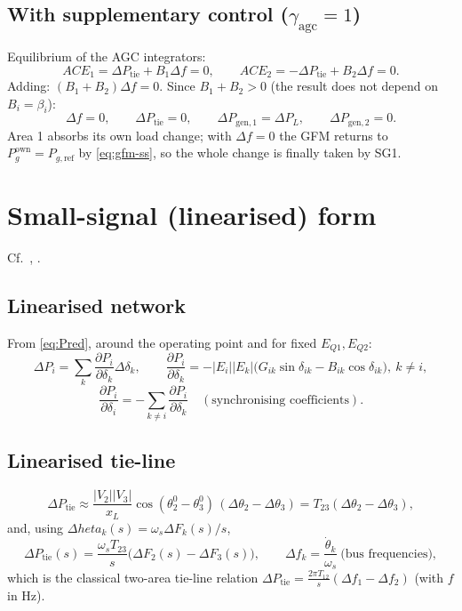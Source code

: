 \documentclass[11pt,a4paper]{article}
\numberwithin{equation}{section}
\begin{document}
\subsection{With supplementary control ($\gamma_{\text{agc}}=1$)}
Equilibrium of the AGC integrators:
\begin{equation}
ACE_1 = \Delta P_{\text{tie}} + B_1\Delta f = 0,\qquad ACE_2 = -\Delta P_{\text{tie}} + B_2\Delta f = 0 .
\end{equation}
Adding: $(B_1+B_2)\Delta f = 0$. Since $B_1+B_2>0$ (the result does not depend on $B_i=\beta_i$):
\begin{equation}
\boxed{\Delta f = 0,\qquad \Delta P_{\text{tie}} = 0,\qquad \Delta P_{\text{gen},1} = \Delta P_L,\qquad \Delta P_{\text{gen},2} = 0 .}
\end{equation}
Area 1 absorbs its own load change; with $\Delta f=0$ the GFM returns to $P_g^{\text{own}} = P_{g,\text{ref}}$ by \eqref{eq:gfm-ss}, so the whole change is finally taken by SG1.

\section{Small-signal (linearised) form}
%
\noindent Cf.\ \cite[Ch.~12]{Kundur1994}, \cite{SauerPai1998}.
\subsection{Linearised network}
From \eqref{eq:Pred}, around the operating point and for fixed $E_{Q1},E_{Q2}$:
\begin{equation}
\Delta P_i = \sum_k \frac{\partial P_i}{\partial\delta_k}\Delta\delta_k,\qquad
\frac{\partial P_i}{\partial\delta_k} = -|E_i||E_k|\big(G_{ik}\sin\delta_{ik} - B_{ik}\cos\delta_{ik}\big),\ k\neq i,
\end{equation}
\begin{equation}
\frac{\partial P_i}{\partial\delta_i} = -\sum_{k\neq i}\frac{\partial P_i}{\partial\delta_k}
\quad(\text{synchronising coefficients}).
\end{equation}
\subsection{Linearised tie-line}
\begin{equation}
\Delta P_{\text{tie}} \approx \frac{|V_2||V_3|}{x_L}\cos(\theta_2^0-\theta_3^0)\,(\Delta\theta_2-\Delta\theta_3) = T_{23}(\Delta\theta_2-\Delta\theta_3),
\end{equation}
and, using $\Delta	heta_k(s) = \omega_s\Delta F_k(s)/s$,
\begin{equation}
\Delta P_{\text{tie}}(s) = \frac{\omega_sT_{23}}{s}\big(\Delta F_{2}(s)-\Delta F_{3}(s)\big),\qquad \Delta f_k = \frac{\dot\theta_k}{\omega_s}\ \text{(bus frequencies)},
\end{equation}
which is the classical two-area tie-line relation $\Delta P_{\text{tie}} = \frac{2\pi T_{12}}{s}(\Delta f_1-\Delta f_2)$ (with $f$ in Hz).
\end{document}
